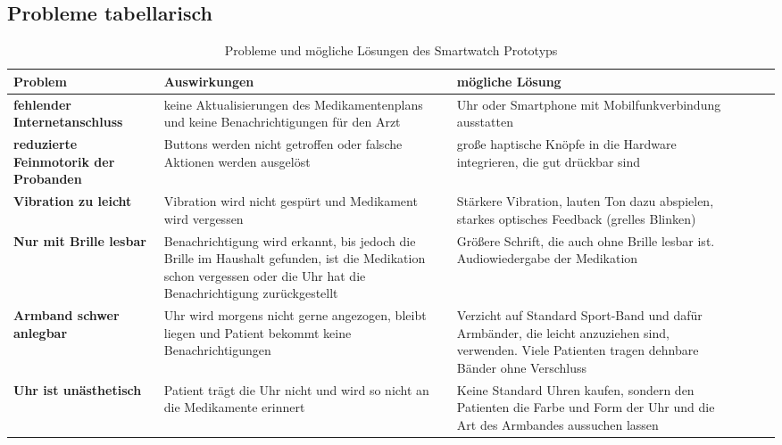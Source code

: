 \subsection{Probleme tabellarisch}
\begin{table}[]
\centering
\caption{Probleme und mögliche Lösungen des Smartwatch Prototyps}
\label{my-label}
\begin{tabular}{p{4cm} p{5cm} p{5cm}|l|l|l|}
\hline
 Problem  &Auswirkungen  &mögliche Lösung  \\ \hline
 \textbf{fehlender Internetanschluss}  &keine Aktualisierungen des Medikamentenplans und keine Benachrichtigungen für den Arzt &Uhr oder Smartphone mit Mobilfunkverbindung ausstatten  \\
 \textbf{reduzierte Feinmotorik der Probanden} &Buttons werden nicht getroffen oder falsche Aktionen werden ausgelöst  &große haptische Knöpfe in die Hardware integrieren, die gut drückbar sind  \\
 \textbf{Vibration zu leicht}&Vibration wird nicht gespürt und Medikament wird vergessen  &Stärkere Vibration, lauten Ton dazu abspielen, starkes optisches Feedback (grelles Blinken)   \\
 \textbf{Nur mit Brille lesbar} &Benachrichtigung wird erkannt, bis jedoch die Brille im Haushalt gefunden, ist die Medikation schon vergessen oder die Uhr hat die Benachrichtigung zurückgestellt  &Größere Schrift, die auch ohne Brille lesbar ist. Audiowiedergabe der Medikation  \\
 \textbf{Armband schwer anlegbar}&Uhr wird morgens nicht gerne angezogen,  bleibt liegen und Patient bekommt keine Benachrichtigungen  &Verzicht auf Standard Sport-Band und dafür Armbänder, die leicht anzuziehen sind, verwenden. Viele Patienten tragen dehnbare Bänder ohne Verschluss \\
 \textbf{Uhr ist unästhetisch}&Patient trägt die Uhr nicht und wird so nicht an die Medikamente erinnert  &Keine Standard Uhren kaufen, sondern den Patienten die Farbe und Form der Uhr und die Art des Armbandes aussuchen lassen  \\ \hline
\end{tabular}
\end{table}